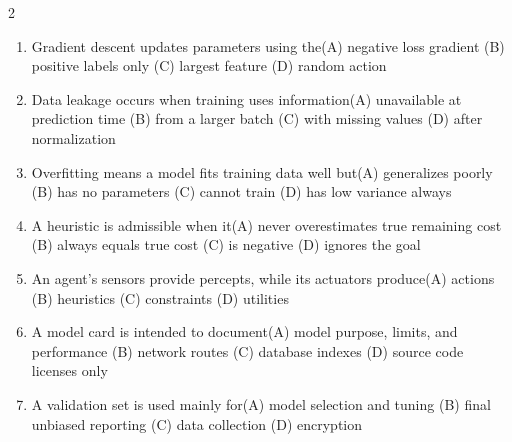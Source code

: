 \documentclass[a4paper]{article}
\begin{document}
\begin{multicols*}{2}
\begin{enumerate}
\item Gradient descent updates parameters using the\newline\hspace*{0.6em}(A) negative loss gradient \quad (B) positive labels only \newline\hspace*{0.6em}(C) largest feature \quad (D) random action
\item Data leakage occurs when training uses information\newline\hspace*{0.6em}(A) unavailable at prediction time \quad (B) from a larger batch \newline\hspace*{0.6em}(C) with missing values \quad (D) after normalization
\item Overfitting means a model fits training data well but\newline\hspace*{0.6em}(A) generalizes poorly \quad (B) has no parameters \newline\hspace*{0.6em}(C) cannot train \quad (D) has low variance always
\item A heuristic is admissible when it\newline\hspace*{0.6em}(A) never overestimates true remaining cost \quad (B) always equals true cost \newline\hspace*{0.6em}(C) is negative \quad (D) ignores the goal
\item An agent's sensors provide percepts, while its actuators produce\newline\hspace*{0.6em}(A) actions \quad (B) heuristics \newline\hspace*{0.6em}(C) constraints \quad (D) utilities
\item A model card is intended to document\newline\hspace*{0.6em}(A) model purpose, limits, and performance \quad (B) network routes \newline\hspace*{0.6em}(C) database indexes \quad (D) source code licenses only
\item A validation set is used mainly for\newline\hspace*{0.6em}(A) model selection and tuning \quad (B) final unbiased reporting \newline\hspace*{0.6em}(C) data collection \quad (D) encryption

\end{enumerate}
\end{multicols*}
\end{document}
